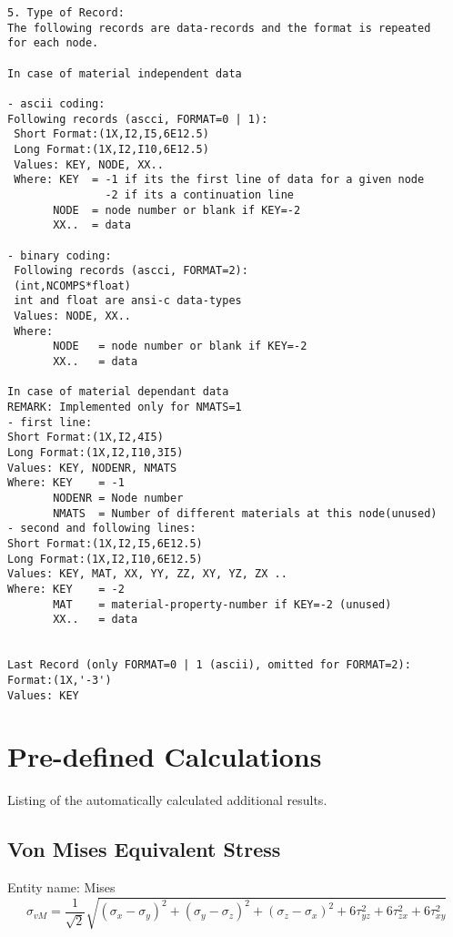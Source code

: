 \documentclass{article}
\begin{document}
\begin{verbatim}
5. Type of Record:
The following records are data-records and the format is repeated
for each node.

In case of material independent data

- ascii coding:
Following records (ascci, FORMAT=0 | 1):
 Short Format:(1X,I2,I5,6E12.5)
 Long Format:(1X,I2,I10,6E12.5)
 Values: KEY, NODE, XX..
 Where: KEY  = -1 if its the first line of data for a given node
               -2 if its a continuation line
       NODE  = node number or blank if KEY=-2
       XX..  = data

- binary coding:
 Following records (ascci, FORMAT=2):
 (int,NCOMPS*float)
 int and float are ansi-c data-types
 Values: NODE, XX..
 Where:
       NODE   = node number or blank if KEY=-2
       XX..   = data

In case of material dependant data
REMARK: Implemented only for NMATS=1
- first line:
Short Format:(1X,I2,4I5)
Long Format:(1X,I2,I10,3I5)
Values: KEY, NODENR, NMATS
Where: KEY    = -1
       NODENR = Node number
       NMATS  = Number of different materials at this node(unused)
- second and following lines:
Short Format:(1X,I2,I5,6E12.5)
Long Format:(1X,I2,I10,6E12.5)
Values: KEY, MAT, XX, YY, ZZ, XY, YZ, ZX ..
Where: KEY    = -2 
       MAT    = material-property-number if KEY=-2 (unused)
       XX..   = data

  
Last Record (only FORMAT=0 | 1 (ascii), omitted for FORMAT=2):
Format:(1X,'-3')
Values: KEY

\end{verbatim}
 
\section{\label{Pre-defined Calculations}Pre-defined Calculations}
Listing of the automatically calculated additional results.

\subsection{\label{Von Mises Equivalent Stress}Von Mises Equivalent Stress}
Entity name: Mises\\
\[  \sigma_{vM} = \frac{1}{\sqrt{2}} \sqrt{(\sigma_{x}-\sigma_{y})^{2}+(\sigma_{y}-\sigma_{z})^{2}+(\sigma_{z}-\sigma_{x})^{2}+6\tau_{yz}^{2}+6\tau_{zx}^{2}+6\tau_{xy}^{2}} \]
\end{document}
